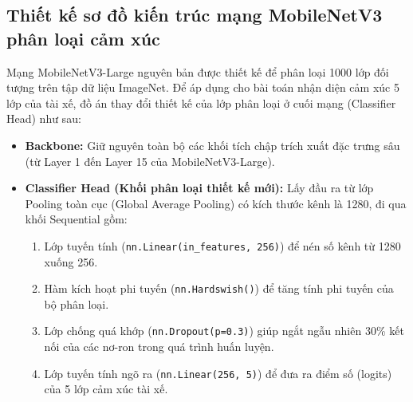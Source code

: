 \documentclass[../DoAn.tex]{subfiles}
\begin{document}
\subsection{Thiết kế sơ đồ kiến trúc mạng MobileNetV3 phân loại cảm xúc}
Mạng MobileNetV3-Large nguyên bản được thiết kế để phân loại 1000 lớp đối tượng trên tập dữ liệu ImageNet. Để áp dụng cho bài toán nhận diện cảm xúc 5 lớp của tài xế, đồ án thay đổi thiết kế của lớp phân loại ở cuối mạng (Classifier Head) như sau:
\begin{itemize}
    \item \textbf{Backbone:} Giữ nguyên toàn bộ các khối tích chập trích xuất đặc trưng sâu (từ Layer 1 đến Layer 15 của MobileNetV3-Large).
    \item \textbf{Classifier Head (Khối phân loại thiết kế mới):} Lấy đầu ra từ lớp Pooling toàn cục (Global Average Pooling) có kích thước kênh là 1280, đi qua khối Sequential gồm:
    \begin{enumerate}
        \item Lớp tuyến tính (\texttt{nn.Linear(in\_features, 256)}) để nén số kênh từ 1280 xuống 256.
        \item Hàm kích hoạt phi tuyến (\texttt{nn.Hardswish()}) để tăng tính phi tuyến của bộ phân loại.
        \item Lớp chống quá khớp (\texttt{nn.Dropout(p=0.3)}) giúp ngắt ngẫu nhiên 30\% kết nối của các nơ-ron trong quá trình huấn luyện.
        \item Lớp tuyến tính ngõ ra (\texttt{nn.Linear(256, 5)}) để đưa ra điểm số (logits) của 5 lớp cảm xúc tài xế.
    \end{enumerate}
\end{itemize}
\end{document}
